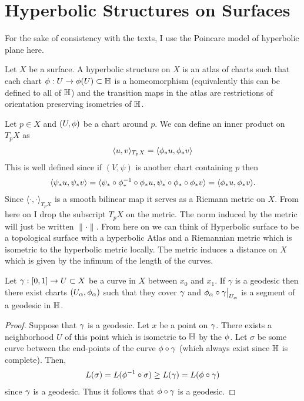 \section{Hyperbolic Structures on Surfaces}
For the sake of consistency with the texts, I use the Poincare model of hyperbolic plane here.
\begin{definition}
  Let $X$ be a surface. A hyperbolic structure on $X$ is an atlas of charts such that each chart $\phi:U\to \phi(U)\subset \mathbb{H}$ is a homeomorphism (equivalently this can be defined to all of $\mathbb{H}$) and the transition maps in the atlas are restrictions of orientation preserving isometries of $\mathbb{H}$.
\end{definition}

Let $p\in X$ and $(U,\phi)$ be a chart around $p$. We can define an inner product on $T_p X$ as
\begin{align*}
  \langle u,v \rangle_{T_pX} = \langle \phi_* u, \phi_* v \rangle  
\end{align*}
This is well defined since if $(V,\psi)$ is another chart containing $p$ then
\begin{align*}
  \langle \psi_* u, \psi_* v \rangle = \langle \psi_*\circ \phi_*^{-1}\circ \phi_* u, \psi_*\circ\phi_*\circ \phi_* v \rangle = \langle \phi_* u, \phi_* v \rangle.
\end{align*}
Since $\langle \cdot, \cdot \rangle_{T_pX}$ is a smooth bilinear map it serves as a Riemann metric on $X$. From here on I drop the subscript $T_pX$ on the metric. The norm induced by the metric will just be written $\|\cdot\|$. From here on we can think of Hyperbolic surface to be a topological surface with a hyperbolic Atlas and a Riemannian metric which is isometric to the hyperbolic metric locally. The metric induces a distance on $X$ which is given by the infimum of the length of the curves.
\begin{proposition}
  Let $\gamma:[0,1] \to U\subset X$ be a curve in $X$ between $x_0$ and $x_1$. If $\gamma$ is a geodesic then there exist charts $(U_\alpha,\phi_\alpha)$ such that they cover $\gamma$ and $\phi_\alpha\circ \gamma\big|_{U_\alpha}$ is a segment of a geodesic in $\mathbb{H}$. 
\end{proposition}
\begin{proof}
  Suppose that $\gamma$ is a geodesic. Let $x$ be a point on $\gamma$. There exists a neighborhood $U$ of this point which is isometric to $\mathbb{H}$ by the $\phi$. Let $\sigma$ be some curve between the end-points of the curve $\phi\circ \gamma$ (which always exist since $\mathbb{H}$ is complete). Then,
  \begin{align*}
    L(\sigma) = L(\phi^{-1}\circ \sigma) \geq L(\gamma) = L(\phi\circ\gamma)
  \end{align*}
  since $\gamma$ is a geodesic. Thus it follows that $\phi\circ \gamma$ is a geodesic.
\end{proof}

